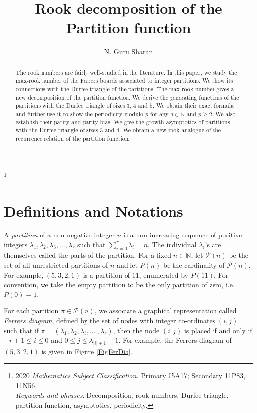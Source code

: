 \documentclass[12pt,reqno]{amsart}
\numberwithin{equation}{section}
\theoremstyle{plain}
\begin{document}
\title[Rook decomposition of the Partition function]{Rook decomposition of the Partition function}
\author{N. Guru Sharan }
\address{Department of Mathematics, Indian Institute of Technology Gandhinagar, Palaj, Gandhinagar, Gujarat-382355, India.}
\thanks{2020 \textit{Mathematics Subject Classification.} Primary 05A17; Secondary 11P83, 11N56.\\
	\textit{Keywords and phrases.} Decomposition, rook numbers, Durfee triangle, partition function, asymptotics, periodicity.}

\begin{abstract}
The rook numbers are fairly well-studied in the literature. In this paper, we study the max-rook number of the Ferrers boards associated to integer partitions. We show its connections with the Durfee triangle of the partitions. The max-rook number gives a new decomposition of the partition function. We derive the generating functions of the partitions with the Durfee triangle of sizes $3$, $4$ and $5$. We obtain their exact formula and further use it to show the periodicity modulo $p$ for any $p \in \mathbb{N}$ and $p\geq2$. We also establish their parity and parity bias. We give the growth asymptotics of partitions with the Durfee triangle of sizes 3 and 4. We obtain a new rook analogue of the recurrence relation of the partition function.
\end{abstract}
\maketitle
\tableofcontents
\section{Definitions and Notations}

	
	A \textit{partition} of a non-negative integer $n$ is a non-increasing sequence of positive integers $\lambda_1, \lambda_2, \lambda_3, \ldots, \lambda_r$ such that $\sum_{i=0}^{r} \lambda_i=n$. The individual $\lambda_i$'s are themselves called the parts of the partition. For a fixed $n \in \mathbb{N}$, let $\mathscr{P}(n)$ be the set of all unrestricted partitions of $n$ and let $P(n)$ be the cardinality of $\mathscr{P}(n)$. For example, $(5,3,2,1)$ is a partition of $11$, enumerated by $P(11)$. For convention, we take the empty partition to be the only partition of zero, i.e. $P(0)=1$.

	For each partition $\pi \in \mathscr{P}(n)$, we associate a graphical representation called \emph{Ferrers diagram}, defined by the set of nodes with integer co-ordinates $(i,j)$ such that if $\pi = (\lambda_1, \lambda_2, \lambda_3, ... \ , \lambda_r)$, then the node $(i,j)$ is placed if and only if $-r+1 \leq i \leq 0$ and $0\leq j \leq \lambda_{|i|+1}-1$. For example, the Ferrers diagram of $(5,3,2,1)$ is given in Figure \ref{FigFerDia}.
	
\end{document}
